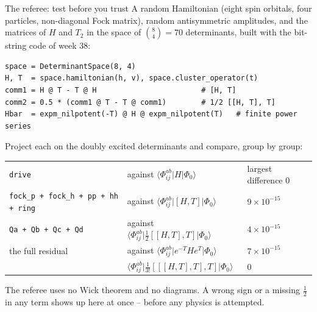 \documentclass[aspectratio=169,10pt]{beamer}
\newcommand{\numbox}[1]{%
  \begin{tcolorbox}[colback=palegreen,colframe=teal!70!black,title={\bfseries Measured}]
  #1
  \end{tcolorbox}}
\newcommand{\mel}[3]{\langle #1\lvert #2\rvert #3\rangle}
\newcommand{\ph}{\Phi_0}
\begin{document}
\begin{frame}[fragile,shrink=1]{The referee: test before you trust}
\small
A random Hamiltonian (eight spin orbitals, four particles, non-diagonal Fock matrix), random antisymmetric amplitudes, and the matrices of $H$ and $T_2$ in the space of $\binom84=70$ determinants, built with the bit-string code of week 38:
\begin{lstlisting}[style=big]
space = DeterminantSpace(8, 4)
H, T  = space.hamiltonian(h, v), space.cluster_operator(t)
comm1 = H @ T - T @ H                        # [H, T]
comm2 = 0.5 * (comm1 @ T - T @ comm1)        # 1/2 [[H, T], T]
Hbar  = expm_nilpotent(-T) @ H @ expm_nilpotent(T)   # finite power series
\end{lstlisting}
Project each on the doubly excited determinants and compare, group by group:
\numbox{\small
\begin{tabular}{@{}lll@{}}
\texttt{drive} & against $\mel{\Phi_{ij}^{ab}}{H}{\ph}$ & largest difference $0$\\
\texttt{fock\_p + fock\_h + pp + hh + ring} & against $\mel{\Phi_{ij}^{ab}}{[H,T]}{\ph}$ & $9\times10^{-15}$\\
\texttt{Qa + Qb + Qc + Qd} & against $\mel{\Phi_{ij}^{ab}}{\tfrac12[[H,T],T]}{\ph}$ & $4\times10^{-15}$\\
the full residual & against $\mel{\Phi_{ij}^{ab}}{e^{-T}He^{T}}{\ph}$ & $7\times10^{-15}$\\
& $\mel{\Phi_{ij}^{ab}}{\tfrac1{3!}[[[H,T],T],T]}{\ph}$ & $0$
\end{tabular}}
The referee uses no Wick theorem and no diagrams. A wrong sign or a missing $\tfrac12$ in any term shows up here at once -- before any physics is attempted.
\end{frame}
\end{document}

